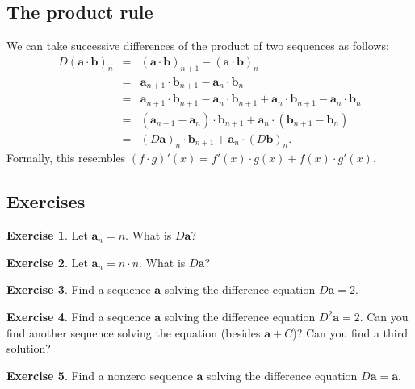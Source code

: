 \documentclass[12pt]{article}
\theoremstyle{definition}
\newtheorem{exercise}{Exercise}
\begin{document}
\subsection*{The product rule}
We can take successive differences of the product of two sequences as
follows:
\begin{eqnarray*}
D\left(\mathbf{a} \cdot \mathbf{b}\right)_n
&=& \left( \mathbf{a} \cdot \mathbf{b} \right)_{n+1}  - 
\left( \mathbf{a} \cdot \mathbf{b} \right)_n  \\
&=& \mathbf{a}_{n+1} \cdot \mathbf{b}_{n+1}  - 
\mathbf{a}_n \cdot \mathbf{b}_n  \\
&=& \mathbf{a}_{n+1} \cdot \mathbf{b}_{n+1} - 
\mathbf{a}_{n} \cdot \mathbf{b}_{n+1} + 
\mathbf{a}_{n} \cdot \mathbf{b}_{n+1} - 
\mathbf{a}_n \cdot \mathbf{b}_n  \\
&=& \left(\mathbf{a}_{n+1} - \mathbf{a}_n\right) \cdot \mathbf{b}_{n+1} +
\mathbf{a}_{n} \cdot \left(\mathbf{b}_{n+1} - \mathbf{b}_n\right) \\
&=& \left( D\mathbf{a}\right)_n \cdot \mathbf{b}_{n+1} + \mathbf{a}_{n} \cdot \left(D\mathbf{b} \right)_n.
\end{eqnarray*}
Formally, this resembles $(f \cdot g)'(x) = f'(x) \cdot g(x) + f(x) \cdot g'(x)$.

\subsection*{Exercises}

\begin{exercise}
Let $\mathbf{a}_n = n$.  What is $D\mathbf{a}$?
\end{exercise}

\begin{exercise}
Let $\mathbf{a}_n = n \cdot n$.  What is $D\mathbf{a}$?
\end{exercise}

\begin{exercise}
  Find a sequence $\mathbf{a}$ solving the difference equation
  $D\mathbf{a} = 2$.
\end{exercise}

\begin{exercise}
  Find a sequence $\mathbf{a}$ solving the difference equation $D^2
  \mathbf{a} = 2$.  Can you find another sequence solving the equation
  (besides $\mathbf{a} + C$)?  Can you find a third solution?
\end{exercise}

\begin{exercise}
  Find a nonzero sequence $\mathbf{a}$ solving the difference equation
  $D\mathbf{a} = \mathbf{a}$.
\end{exercise}
\end{document}
